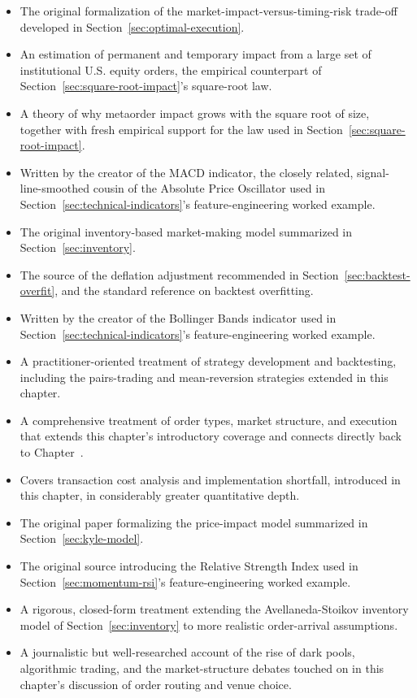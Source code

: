 \documentclass[../ai_in_finance]{subfiles}
\begin{document}
\begin{itemize}
    \item {} The original formalization of the market-impact-versus-timing-risk trade-off developed in Section~\ref{sec:optimal-execution}.
    \item {} An estimation of permanent and temporary impact from a large set of institutional U.S. equity orders, the empirical counterpart of Section~\ref{sec:square-root-impact}'s square-root law.
    \item {} A theory of why metaorder impact grows with the square root of size, together with fresh empirical support for the law used in Section~\ref{sec:square-root-impact}.
    \item {} Written by the creator of the MACD indicator, the closely related, signal-line-smoothed cousin of the Absolute Price Oscillator used in Section~\ref{sec:technical-indicators}'s feature-engineering worked example.
    \item {} The original inventory-based market-making model summarized in Section~\ref{sec:inventory}.
    \item {} The source of the deflation adjustment recommended in Section~\ref{sec:backtest-overfit}, and the standard reference on backtest overfitting.
    \item {} Written by the creator of the Bollinger Bands indicator used in Section~\ref{sec:technical-indicators}'s feature-engineering worked example.
    \item {} A practitioner-oriented treatment of strategy development and backtesting, including the pairs-trading and mean-reversion strategies extended in this chapter.
    \item {} A comprehensive treatment of order types, market structure, and execution that extends this chapter's introductory coverage and connects directly back to Chapter~.
    \item {} Covers transaction cost analysis and implementation shortfall, introduced in this chapter, in considerably greater quantitative depth.
    \item {} The original paper formalizing the price-impact model summarized in Section~\ref{sec:kyle-model}.
    \item {} The original source introducing the Relative Strength Index used in Section~\ref{sec:momentum-rsi}'s feature-engineering worked example.
    \item {} A rigorous, closed-form treatment extending the Avellaneda-Stoikov inventory model of Section~\ref{sec:inventory} to more realistic order-arrival assumptions.
    \item {} A journalistic but well-researched account of the rise of dark pools, algorithmic trading, and the market-structure debates touched on in this chapter's discussion of order routing and venue choice.
\end{itemize}
\end{document}

